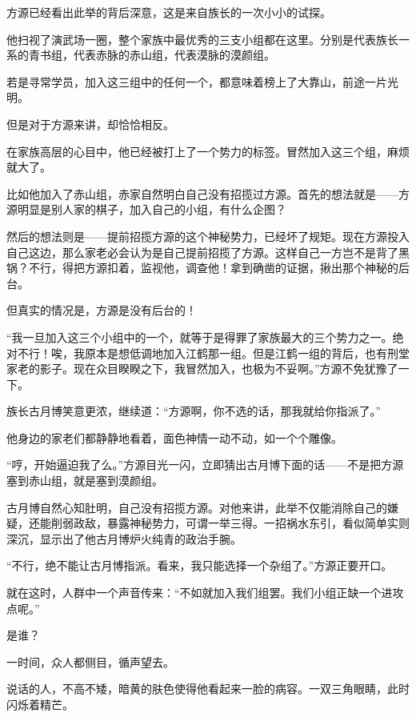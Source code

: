 
\begin{this_body}

方源已经看出此举的背后深意，这是来自族长的一次小小的试探。

他扫视了演武场一圈，整个家族中最优秀的三支小组都在这里。分别是代表族长一系的青书组，代表赤脉的赤山组，代表漠脉的漠颜组。

若是寻常学员，加入这三组中的任何一个，都意味着榜上了大靠山，前途一片光明。

但是对于方源来讲，却恰恰相反。

在家族高层的心目中，他已经被打上了一个势力的标签。冒然加入这三个组，麻烦就大了。

比如他加入了赤山组，赤家自然明白自己没有招揽过方源。首先的想法就是——方源明显是别人家的棋子，加入自己的小组，有什么企图？

然后的想法则是——提前招揽方源的这个神秘势力，已经坏了规矩。现在方源投入自己这边，那么家老必会认为是自己提前招揽了方源。这样自己一方岂不是背了黑锅？不行，得把方源扣着，监视他，调查他！拿到确凿的证据，揪出那个神秘的后台。

但真实的情况是，方源是没有后台的！

“我一旦加入这三个小组中的一个，就等于是得罪了家族最大的三个势力之一。绝对不行！唉，我原本是想低调地加入江鹤那一组。但是江鹤一组的背后，也有刑堂家老的影子。现在众目睽睽之下，我冒然加入，也极为不妥啊。”方源不免犹豫了一下。

族长古月博笑意更浓，继续道：“方源啊，你不选的话，那我就给你指派了。”

他身边的家老们都静静地看着，面色神情一动不动，如一个个雕像。

“哼，开始逼迫我了么。”方源目光一闪，立即猜出古月博下面的话——不是把方源塞到赤山组，就是塞到漠颜组。

古月博自然心知肚明，自己没有招揽方源。对他来讲，此举不仅能消除自己的嫌疑，还能削弱政敌，暴露神秘势力，可谓一举三得。一招祸水东引，看似简单实则深沉，显示出了他古月博炉火纯青的政治手腕。

“不行，绝不能让古月博指派。看来，我只能选择一个杂组了。”方源正要开口。

就在这时，人群中一个声音传来：“不如就加入我们组罢。我们小组正缺一个进攻点呢。”

是谁？

一时间，众人都侧目，循声望去。

说话的人，不高不矮，暗黄的肤色使得他看起来一脸的病容。一双三角眼睛，此时闪烁着精芒。


\end{this_body}
